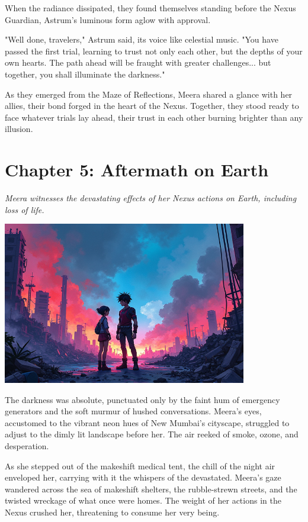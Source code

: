 \documentclass[12pt]{report}  %
\begin{document}
When the radiance dissipated, they found themselves standing before the
Nexus Guardian, Astrum's luminous form aglow with approval.

"Well done, travelers," Astrum said, its voice like celestial music.
"You have passed the first trial, learning to trust not only each other,
but the depths of your own hearts. The path ahead will be fraught with
greater challenges... but together, you shall illuminate the darkness."

As they emerged from the Maze of Reflections, Meera shared a glance with
her allies, their bond forged in the heart of the Nexus. Together, they
stood ready to face whatever trials lay ahead, their trust in each other
burning brighter than any illusion.


\chapter*{Chapter 5: Aftermath on Earth}
\textit{Meera witnesses the devastating effects of her Nexus actions on Earth, including loss of life.}

\begin{center}
\includegraphics[width=0.8\textwidth]{stories/my_story/step_6/scenes/earth_aftermath.live.png}
\end{center}

The darkness was absolute, punctuated only by the faint hum of emergency
generators and the soft murmur of hushed conversations. Meera's eyes,
accustomed to the vibrant neon hues of New Mumbai's cityscape, struggled
to adjust to the dimly lit landscape before her. The air reeked of
smoke, ozone, and desperation.

As she stepped out of the makeshift medical tent, the chill of the night
air enveloped her, carrying with it the whispers of the devastated.
Meera's gaze wandered across the sea of makeshift shelters, the
rubble-strewn streets, and the twisted wreckage of what once were homes.
The weight of her actions in the Nexus crushed her, threatening to
consume her very being.
\end{document}
